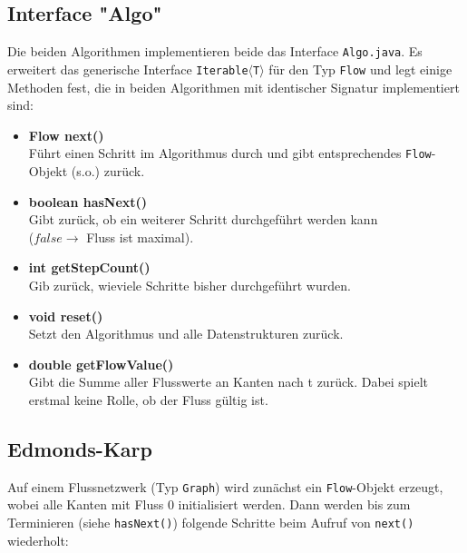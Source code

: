 \documentclass{llncs}
\begin{document}
\subsection{Interface "Algo"}

Die beiden Algorithmen implementieren beide das Interface \texttt{Algo.java}. Es erweitert das generische Interface \texttt{Iterable$\langle$T$\rangle$} für den Typ \texttt{Flow} und legt einige Methoden fest, die in beiden Algorithmen mit identischer Signatur implementiert sind:

\begin{itemize}
\item \textbf{Flow next()} \\
Führt einen Schritt im Algorithmus durch und gibt entsprechendes \texttt{Flow}-Objekt (s.o.) zurück.

\item \textbf{boolean hasNext()}\\
Gibt zurück, ob ein weiterer Schritt durchgeführt werden kann \\ ($false \rightarrow$ Fluss ist maximal).

\item \textbf{int getStepCount()}\\
Gib zurück, wieviele Schritte bisher durchgeführt wurden.

\item \textbf{void reset()}\\
Setzt den Algorithmus und alle Datenstrukturen zurück.

\item \textbf{double getFlowValue()}\\
Gibt die Summe aller Flusswerte an Kanten nach t zurück. Dabei spielt erstmal keine Rolle, ob der Fluss gültig ist.
\end{itemize}
\subsection{Edmonds-Karp}

Auf einem Flussnetzwerk (Typ \texttt{Graph}) wird zunächst ein \texttt{Flow}-Objekt erzeugt, wobei alle Kanten mit Fluss 0 initialisiert werden.
Dann werden bis zum Terminieren (siehe \texttt{hasNext()}) folgende Schritte beim Aufruf von \texttt{next()} wiederholt:
\end{document}
